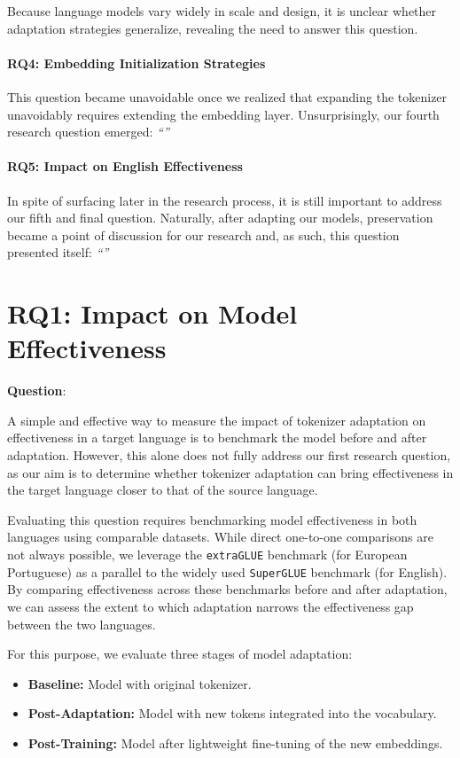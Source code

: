 Because language models vary widely in scale and design, it is unclear whether adaptation strategies generalize, revealing the need to answer this question.


\paragraph{RQ4: Embedding Initialization Strategies}
This question became unavoidable once we realized that expanding the tokenizer unavoidably requires extending the embedding layer. Unsurprisingly, our fourth research question emerged: \textit{``\RQfour''}  



\paragraph{RQ5: Impact on English Effectiveness}
In spite of surfacing later in the research process, it is still important to address our fifth and final question. Naturally, after adapting our models, preservation became a point of discussion for our research and, as such, this question presented itself: \textit{``\RQfive''}  



\section{RQ1: Impact on Model Effectiveness}
\label{sec:model_effectiveness}
\textbf{Question}: \textit{\RQone}

A simple and effective way to measure the impact of tokenizer adaptation on effectiveness in a target language is to benchmark the model before and after adaptation. However, this alone does not fully address our first research question, as our aim is to determine whether tokenizer adaptation can bring effectiveness in the target language closer to that of the source language.

Evaluating this question requires benchmarking model effectiveness in both languages using comparable datasets. While direct one-to-one comparisons are not always possible, we leverage the \texttt{extraGLUE} benchmark (for European Portuguese) as a parallel to the widely used \texttt{SuperGLUE} benchmark (for English). By comparing effectiveness across these benchmarks before and after adaptation, we can assess the extent to which adaptation narrows the effectiveness gap between the two languages.

For this purpose, we evaluate three stages of model adaptation:
\begin{itemize}
    \item \textbf{Baseline:} Model with original tokenizer.
    \item \textbf{Post-Adaptation:} Model with new tokens integrated into the vocabulary.
    \item \textbf{Post-Training:} Model after lightweight fine-tuning of the new embeddings.
\end{itemize}

